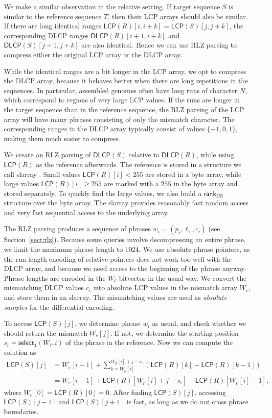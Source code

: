 \documentclass[a4paper,11pt]{llncs}
\newcommand{\set}[1]{\ensuremath{\{ #1 \}}}
\newcommand{\LCP}{\textsf{LCP}}
\newcommand{\DLCP}{\textsf{DLCP}}
\newcommand{\mLCP}{\ensuremath{\mathsf{LCP}}}
\newcommand{\mDLCP}{\ensuremath{\mathsf{DLCP}}}
\newcommand{\RLZ}{\textsf{RLZ}}
\newcommand{\slarray}{\textsf{slarray}}
\newcommand{\mrank}{\ensuremath{\mathsf{rank}}}
\newcommand{\mselect}{\ensuremath{\mathsf{select}}}
\begin{document}
We make a similar observation in the relative setting. If target sequence $S$ is similar to the reference sequence $T$, then their \LCP{} arrays should also be similar. If there are long identical ranges $\mLCP(R)[i,i+k] = \mLCP(S)[j,j+k]$, the corresponding \DLCP{} ranges $\mDLCP(R)[i+1,i+k]$ and $\mDLCP(S)[j+1,j+k]$ are also identical. Hence we can use \RLZ{} parsing to compress either the original \LCP{} array or the \DLCP{} array.

While the identical ranges are a bit longer in the \LCP{} array, we opt to compress the \DLCP{} array, because it behaves better when there are long repetitions in the sequences. In particular, assembled genomes often have long runs of character $N$, which correspond to regions of very large \LCP{} values. If the runs are longer in the target sequence than in the reference sequence, the \RLZ{} parsing of the \LCP{} array will have many phrases consisting of only the mismatch character. The corresponding ranges in the \DLCP{} array typically consist of values $\set{-1, 0, 1}$, making them much easier to compress.

We create an \RLZ{} parsing of $\mDLCP(S)$ relative to $\mDLCP(R)$, while using $\mLCP(R)$ as the reference afterwards. The reference is stored in a structure we call \slarray{} \cite{Abouelhoda2004}. Small values $\mLCP(R)[i] < 255$ are stored in a byte array, while large values $\mLCP(R)[i] \ge 255$ are marked with a $255$ in the byte array and stored separately. To quickly find the large values, we also build a $\mrank_{255}$ structure over the byte array. The \slarray{} provides reasonably fast random access and very fast sequential access to the underlying array.

The \RLZ{} parsing produces a sequence of phrases $w_{i} = (p_{i}, \ell_{i}, c_{i})$ (see Section~\ref{sect:rlz}). Because some queries involve decompressing an entire phrase, we limit the maximum phrase length to $1024$. We use absolute phrase pointers, as the run-length encoding of relative pointers does not work too well with the \DLCP{} array, and because we need access to the beginning of the phrase anyway. Phrase lengths are encoded in the $W_{\ell}$ bitvector in the usual way. We convert the mismatching \DLCP{} values $c_{i}$ into absolute \LCP{} values in the mismatch array $W_{c}$, and store them in an \slarray. The mismatching values are used as \emph{absolute samples} for the differential encoding.

To access $\mLCP(S)[j]$, we determine phrase $w_{i}$ as usual, and check whether we should return the mismatch $W_{c}[j]$. If not, we determine the starting position $s_{i} = \mselect_{1}(W_{\ell}, i)$ of the phrase in the reference. Now we can compute the solution as
\begin{align*}
\mLCP(S)[j] &= W_{c}[i-1] + \sum_{k = W_{p}[i]}^{W_{p}[i]+j-s_{i}} (\mLCP(R)[k] - \mLCP(R)[k-1]) \\
&= W_{c}[i-1] + \mLCP(R)[W_{p}[i]+j-s_{i}] - \mLCP(R)[W_{p}[i]-1],
\end{align*}
where $W_{c}[0] = \mLCP(R)[0] = 0$. After finding $\mLCP(S)[j]$, accessing $\mLCP(S)[j-1]$ and $\mLCP(S)[j+1]$ is fast, as long as we do not cross phrase boundaries.
\end{document}

